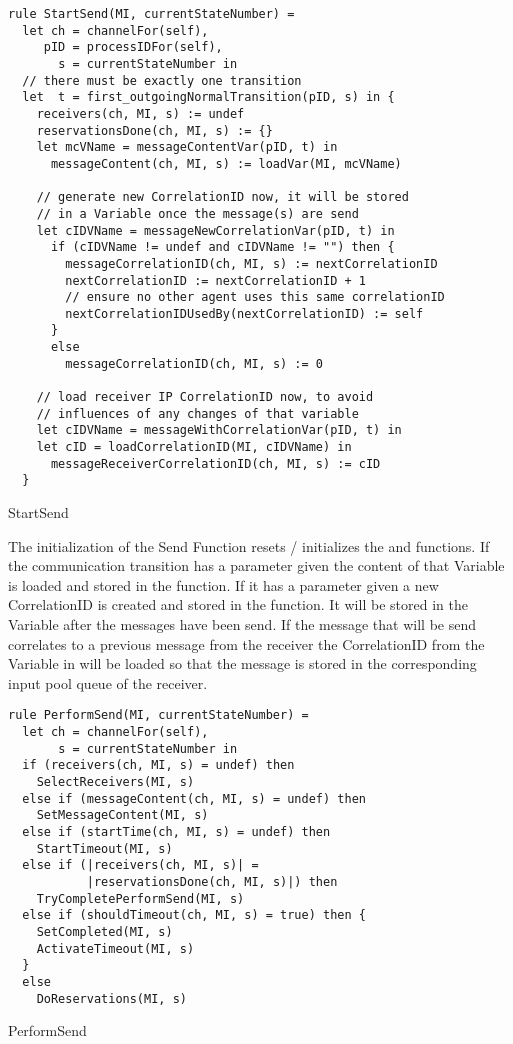 \begin{listing}[htbp]
\begin{verbatim}
rule StartSend(MI, currentStateNumber) =
  let ch = channelFor(self),
     pID = processIDFor(self),
       s = currentStateNumber in
  // there must be exactly one transition
  let  t = first_outgoingNormalTransition(pID, s) in {
    receivers(ch, MI, s) := undef
    reservationsDone(ch, MI, s) := {}
    let mcVName = messageContentVar(pID, t) in
      messageContent(ch, MI, s) := loadVar(MI, mcVName)

    // generate new CorrelationID now, it will be stored
    // in a Variable once the message(s) are send
    let cIDVName = messageNewCorrelationVar(pID, t) in
      if (cIDVName != undef and cIDVName != "") then {
        messageCorrelationID(ch, MI, s) := nextCorrelationID
        nextCorrelationID := nextCorrelationID + 1
        // ensure no other agent uses this same correlationID
        nextCorrelationIDUsedBy(nextCorrelationID) := self
      }
      else
        messageCorrelationID(ch, MI, s) := 0

    // load receiver IP CorrelationID now, to avoid
    // influences of any changes of that variable
    let cIDVName = messageWithCorrelationVar(pID, t) in
    let cID = loadCorrelationID(MI, cIDVName) in
      messageReceiverCorrelationID(ch, MI, s) := cID
  }
\end{verbatim}
\caption{StartSend}
\label{lst:shortasm:StartSend}
\end{listing}


The initialization of the Send Function resets / initializes the  and  functions. If the communication transition has a  parameter given the content of that Variable is loaded and stored in the  function. If it has a  parameter given a new CorrelationID is created and stored in the  function. It will be stored in the Variable after the messages have been send. If the message that will be send correlates to a previous message from the receiver the CorrelationID from the Variable in  will be loaded so that the message is stored in the corresponding input pool queue of the receiver.


\begin{listing}[htbp]
\begin{verbatim}
rule PerformSend(MI, currentStateNumber) =
  let ch = channelFor(self),
       s = currentStateNumber in
  if (receivers(ch, MI, s) = undef) then
    SelectReceivers(MI, s)
  else if (messageContent(ch, MI, s) = undef) then
    SetMessageContent(MI, s)
  else if (startTime(ch, MI, s) = undef) then
    StartTimeout(MI, s)
  else if (|receivers(ch, MI, s)| =
           |reservationsDone(ch, MI, s)|) then
    TryCompletePerformSend(MI, s)
  else if (shouldTimeout(ch, MI, s) = true) then {
    SetCompleted(MI, s)
    ActivateTimeout(MI, s)
  }
  else
    DoReservations(MI, s)
\end{verbatim}
\caption{PerformSend}
\label{lst:shortasm:PerformSend}
\end{listing}


